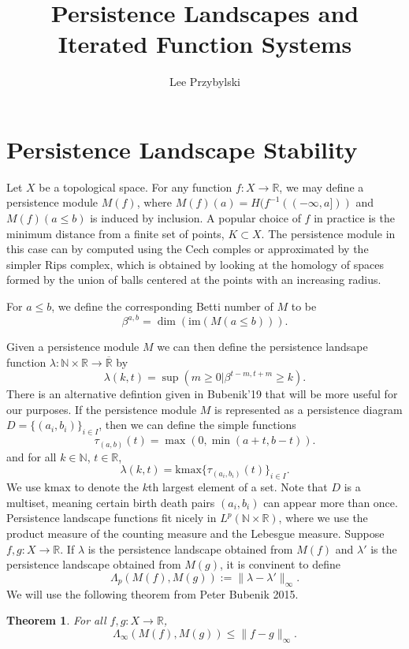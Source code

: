 \documentclass [52pt] {article}
\title{Persistence Landscapes and Iterated Function Systems}
\author{Lee Przybylski}
\newcommand{\R}{\mathbb{R}}
\newcommand{\N}{\mathbb{N}}
\newtheorem{theorem}{Theorem}
\begin{document}
\maketitle
\section{Persistence Landscape Stability}
Let $X$ be a topological space.  For any function $f:X\to\R$, we may define a persistence module $M(f)$, where $M(f)(a) = H(f^{-1}((-\infty,a]))$ and $M(f)(a\le b)$ is induced by inclusion.  A popular choice of $f$ in practice is the minimum distance from a finite set of points, $K\subset X$.  The persistence module in this case can by computed using the Cech comples or approximated by the simpler Rips complex, which is obtained by looking at the homology of spaces formed by the union of balls centered at the points with an increasing radius.  

For $a\le b$, we define the corresponding Betti number of $M$ to be
\begin{equation}
\beta^{a,b} = \dim(\text{im}(M(a\le b))).
\end{equation}

Given a persistence module $M$ we can then define the persistence landsape function $\lambda:\mathbb{N}\times \R \to\overline{\R}$ by
\[\lambda(k,t) = \sup(m\ge 0|\beta^{t-m,t+m}\ge k).\]
There is an alternative defintion given in Bubenik'19 that will be more useful for our purposes.  If the persistence module $M$ is represented as a persistence diagram $D = \{(a_i,b_i)\}_{i\in I}$, then we can define the simple functions
\[\tau_{(a,b)}(t) = \max(0,\min(a+t,b-t)).\] 
and for all $k\in\N$, $t\in\R$,
\begin{equation}\label{eq : kmaxdef}
\lambda(k,t)=\text{kmax}\{\tau_{(a_i,b_i)}(t)\}_{i\in I}.
\end{equation}
We use $\text{kmax}$ to denote the $k$th largest element of a set.  Note that $D$ is a multiset, meaning certain birth death pairs $(a_i,b_i)$ can appear more than once.  Persistence landscape functions fit nicely in $L^p(\mathbb{N}\times\R)$, where we use the product measure of the counting measure and the Lebesgue measure.  Suppose $f,g:X\to\R$.  If $\lambda$ is the persistence landscape obtained from $M(f)$ and $\lambda'$ is the persistence landscape obtained from $M(g)$, it is convinent to define
\begin{equation}
\Lambda_p(M(f),M(g)) := \|\lambda-\lambda'\|_\infty.
\end{equation}
We will use the following theorem from Peter Bubenik 2015.
\begin{theorem}\label{thm : PLstab1}
 For all $f,g:X\to\R$,
\[\Lambda_\infty(M(f),M(g))\le \|f-g\|_\infty.\]
\end{theorem}
\end{document}
